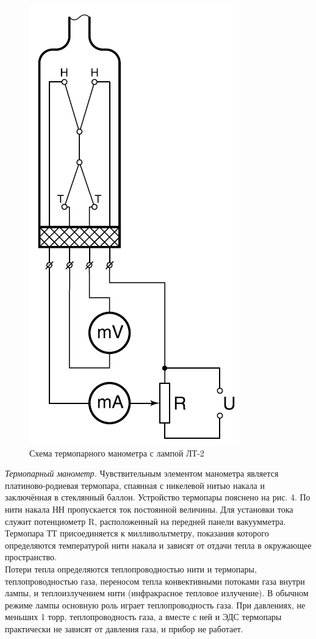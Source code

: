 \documentclass[12pt]{article}
\begin{document}
 \begin{figure}[H]
 	\begin{center}
 		\includegraphics[width=0.5\linewidth]{термопара.PNG}
 		\caption{Схема термопарного манометра с лампой ЛТ-2}
 		\label{fig:Схема термопары}
 	\end{center}
 \end{figure}
 \textit{Термопарный манометр.} Чувствительным элементом манометра является платиново-родиевая термопара, спаянная с никелевой нитью накала и заключённая в стеклянный баллон. Устройство термопары пояснено на рис. 4. По нити накала НН пропускается ток постоянной величины. Для установки тока служит потенциометр R, расположенный на передней панели вакуумметра. Термопара ТТ присоединяется к милливольтметру, показания которого определяются температурой нити накала и зависят от отдачи тепла в окружающее пространство. \\
 Потери тепла определяются теплопроводностью нити и термопары, теплопроводностью газа, переносом тепла конвективными потоками газа внутри лампы, и теплоизлучением нити (инфракрасное тепловое излучение). В обычном режиме лампы основную роль играет теплопроводность газа. При давлениях, не меньших 1 торр, теплопроводность газа, а вместе с ней и ЭДС термопары практически не зависят от давления газа, и прибор не работает. \\
\end{document}
